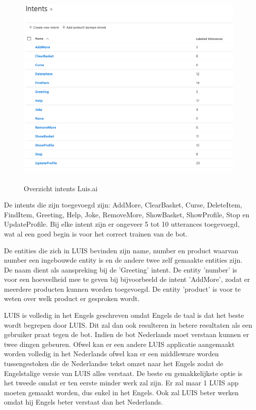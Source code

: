 \begin{figure}[h!]
	\centering
	\includegraphics[height=10cm]{img/luis.png}
	\caption{Overzicht intents Luis.ai}
	\label{fig:trainingdialogflow}
\end{figure}

De intents die zijn toegevoegd zijn: AddMore, ClearBasket, Curse, DeleteItem, FindItem, Greeting, Help, Joke, RemoveMore, ShowBasket, ShowProfile, Stop en UpdateProfile. Bij elke intent zijn er ongeveer 5 tot 10 utterances toegevoegd, wat al een goed begin is voor het correct trainen van de bot.

De entities die zich in LUIS bevinden zijn name, number en product waarvan number een ingebouwde entity is en de andere twee zelf gemaakte entities zijn. De naam dient als aanspreking bij de 'Greeting' intent. De entity 'number' is voor een hoeveelheid mee te geven bij bijvoorbeeld de intent 'AddMore', zodat er meerdere producten kunnen worden toegevoegd. De entity 'product' is voor te weten over welk product er gesproken wordt.

LUIS is volledig in het Engels geschreven omdat Engels de taal is dat het beste wordt begrepen door LUIS. Dit zal dan ook resulteren in betere resultaten als een gebruiker praat tegen de bot. Indien de bot Nederlands moet verstaan kunnen er twee dingen gebeuren. Ofwel  kan er een andere LUIS applicatie aangemaakt worden volledig in het Nederlands ofwel kan er een middleware worden tussengestoken die de Nederlandse tekst omzet naar het Engels zodat de Engelstalige versie van LUIS alles verstaat. De beste en gemakkelijkste optie is het tweede omdat er ten eerste minder werk zal zijn. Er zal maar 1 LUIS app moeten gemaakt worden, dus enkel in het Engels. Ook zal LUIS beter werken omdat hij Engels beter verstaat dan het Nederlands.

